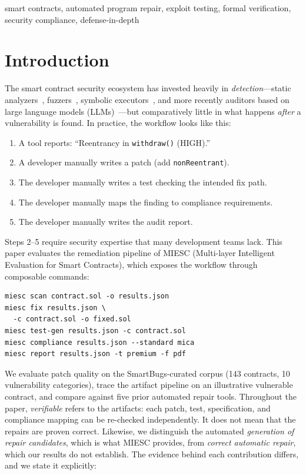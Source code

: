 \documentclass[conference]{IEEEtran}
\begin{document}
\begin{IEEEkeywords}
smart contracts, automated program repair, exploit testing, formal verification, security compliance, defense-in-depth
\end{IEEEkeywords}

\section{Introduction}

The smart contract security ecosystem has invested heavily in \emph{detection}---static analyzers~\cite{feist2019slither}, fuzzers~\cite{grieco2020echidna}, symbolic executors~\cite{mueller2018smashing}, and more recently auditors based on large language models (LLMs)~\cite{sun2024gptscan}---but comparatively little in what happens \emph{after} a vulnerability is found. In practice, the workflow looks like this:

\begin{enumerate}
    \item A tool reports: ``Reentrancy in \texttt{withdraw()} (HIGH).''
    \item A developer manually writes a patch (add \texttt{nonReentrant}).
    \item The developer manually writes a test checking the intended fix path.
    \item The developer manually maps the finding to compliance requirements.
    \item The developer manually writes the audit report.
\end{enumerate}

Steps 2--5 require security expertise that many development teams lack. This paper evaluates the remediation pipeline of MIESC (Multi-layer Intelligent Evaluation for Smart Contracts), which exposes the workflow through composable commands:

\begin{verbatim}
miesc scan contract.sol -o results.json
miesc fix results.json \
  -c contract.sol -o fixed.sol
miesc test-gen results.json -c contract.sol
miesc compliance results.json --standard mica
miesc report results.json -t premium -f pdf
\end{verbatim}

We evaluate patch quality on the SmartBugs-curated corpus (143 contracts, 10 vulnerability categories), trace the artifact pipeline on an illustrative vulnerable contract, and compare against five prior automated repair tools. Throughout the paper, \emph{verifiable} refers to the artifacts: each patch, test, specification, and compliance mapping can be re-checked independently. It does not mean that the repairs are proven correct. Likewise, we distinguish the automated \emph{generation of repair candidates}, which is what MIESC provides, from \emph{correct automatic repair}, which our results do not establish. The evidence behind each contribution differs, and we state it explicitly:
\end{document}
